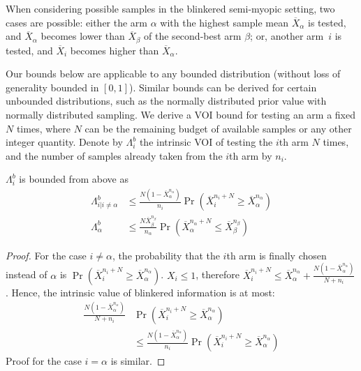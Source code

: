 When considering possible samples in the blinkered semi-myopic setting,
two cases are possible: either
	the arm $\alpha$ with the highest sample mean $\overline
  	X_\alpha$ is tested, and $\overline X_\alpha$ becomes lower than
 	$\overline X_\beta$ of the second-best arm $\beta$;
or, 
	another arm~$i$ is tested, and $\overline X_i$ becomes higher
    than $\overline X_\alpha$.


Our bounds below are applicable to any bounded distribution (without loss of generality 
bounded in $[0,1]$). Similar
bounds can be derived for certain unbounded distributions, such as the
normally distributed prior value with normally distributed
sampling.
We derive a VOI bound for testing an arm a fixed $N$ times,
where $N$ can be the remaining budget of available samples or
any other integer quantity.
Denote by  $\Lambda_i^b$ the intrinsic VOI of testing the $i$th arm
$N$ times, and the number of
samples already taken from the $i$th arm by $n_i$.
\begin{thm} $\Lambda_i^b$ is bounded from above as
\begin{align}
\label{eqn:mcts-thm-be}
\Lambda_{i|i\ne\alpha}^b&\le \frac {N(1-\overline X_\alpha^{n_\alpha})} {n_i}\Pr(\overline   X_i^{{n_i}+N}\ge\overline X_\alpha^{n_\alpha})\nonumber\\
\Lambda_\alpha^b&\le \frac {N \overline X_\beta^{n_\beta}} {n_\alpha} \Pr(\overline X_\alpha^{n_\alpha+N}\le\overline X_\beta^{n_\beta})
\end{align}
\label{thm:mcts-be}
\end{thm}
\begin{proof} For the case $i\ne \alpha$, the probability that the
	  $i$th arm is finally chosen instead of $\alpha$ is
	  $\Pr(\overline X_i^{n_i+N} \ge \overline X_\alpha^{n_\alpha})$. $X_i \le 1$,
	  therefore $\overline X_i^{n_i+N}\le \overline
	  X_\alpha^{n_\alpha}+\frac {N(1-\overline X_\alpha^{n_\alpha})} {N+n_i}$. Hence, the intrinsic value of blinkered
	  information is at most: 
	\begin{align}
	\label{eq:simplistic}
	\frac{ N(1-\overline  X_\alpha^{n_\alpha})}
	  {N+n_i}&\Pr(\overline X_i^{{n_i}+N}\ge\overline X_\alpha^{n_\alpha})\nonumber \\
	&\le\frac{ N(1-\overline  X_\alpha^{n_\alpha})}
	{n_i}\Pr(\overline X_i^{{n_i}+N}\ge\overline X_\alpha^{n_\alpha})
	\end{align}
	  Proof for the case $i=\alpha$ is similar.
\end{proof}


